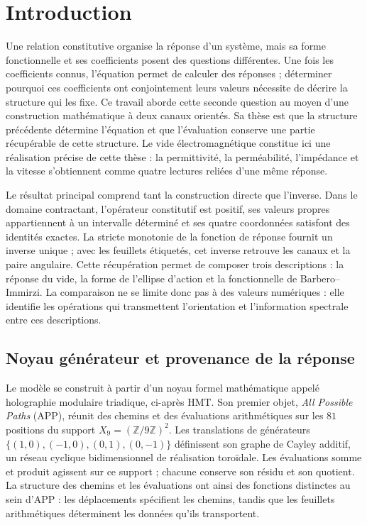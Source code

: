 \clearpage
\section{Introduction}
\label{iii:sec:introduccion}

Une relation constitutive organise la réponse d’un système, mais sa
forme fonctionnelle et ses coefficients posent des questions différentes. Une
fois les coefficients connus, l’équation permet de calculer des réponses ;
déterminer pourquoi ces coefficients ont conjointement leurs valeurs
nécessite de décrire la structure qui les fixe. Ce travail aborde cette
seconde question au moyen d’une construction mathématique à deux canaux
orientés. Sa thèse est que la structure précédente détermine
l’équation et que l’évaluation conserve une partie récupérable de cette
structure. Le vide électromagnétique constitue ici une réalisation
précise de cette thèse : la permittivité, la perméabilité, l’impédance et la vitesse
s’obtiennent comme quatre lectures reliées d’une même réponse.

Le résultat principal comprend tant la construction directe que
l’inverse. Dans le domaine contractant, l’opérateur constitutif est positif,
ses valeurs propres appartiennent à un intervalle déterminé et ses quatre
coordonnées satisfont des identités exactes. La stricte monotonie de la
fonction de réponse fournit un inverse unique ; avec les feuillets
étiquetés, cet inverse retrouve les canaux et la paire angulaire. Cette
récupération permet de composer trois descriptions : la réponse du
vide, la forme de l’ellipse d’action et la fonctionnelle de
Barbero--Immirzi. La comparaison ne se limite donc pas à des valeurs
numériques : elle identifie les opérations qui transmettent l’orientation et
l’information spectrale entre ces descriptions.

\subsection{Noyau générateur et provenance de la réponse}

Le modèle se construit à partir d’un noyau formel mathématique appelé
holographie modulaire triadique, ci-après HMT. Son premier objet,
\emph{All Possible Paths} (APP), réunit des chemins et des évaluations
arithmétiques sur les $81$ positions du support
$X_9=(\mathbb Z/9\mathbb Z)^2$. Les translations de générateurs
$\{(1,0),(-1,0),(0,1),(0,-1)\}$ définissent son graphe de Cayley additif,
un réseau cyclique bidimensionnel de réalisation toroïdale. Les
évaluations somme et produit agissent sur ce support ; chacune conserve
son résidu et son quotient. La structure des chemins et les évaluations
ont ainsi des fonctions distinctes au sein d’APP : les déplacements
spécifient les chemins, tandis que les feuillets arithmétiques déterminent les
données qu’ils transportent.

